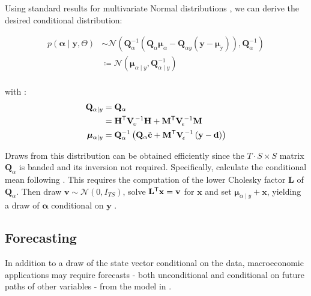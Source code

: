 \documentclass[notitlepage,a4paper,12pt]{article}
\newcommand{\transpose}[1]{{#1}^{\sf{T}}}
\begin{document}
Using standard results for multivariate Normal distributions \citep[e.g.][pp. 86-87]{bishop_prml_2006}, we can derive the desired conditional distribution:

\begin{align*}
    p
    \left(
        \boldsymbol{\alpha} \mid \mathbf{y}, \Theta
     \right) 
    &\sim
    \mathcal{N}
    \left(
    \mathbf{Q}^{-1}_{\alpha} \left( \mathbf{Q}_{\alpha}\boldsymbol{\mu}_{\alpha} - \mathbf{Q}_{\alpha y} \left(\mathbf{y} - \boldsymbol{\mu}_{\text{y}}\right)\right), \mathbf{Q}_{\alpha}^{-1}
    \right) \\
    &\coloneqq \mathcal{N}
        \left(
            \boldsymbol{\mu}_{\alpha\mid y}, \mathbf{Q}_{\alpha\mid y}^{-1}
        \right) \\
\end{align*}

with \citep[see also][eqn. 6-8]{chanjeliazkov_2009}:
\begin{align*}
    \mathbf{Q}_{\alpha\mid y} &= \mathbf{Q}_{\alpha} \\
    &= 
    \transpose{\mathbf{H}} \mathbf{V}^{\,-1}_{\!\upsilon} \mathbf{H} + {\transpose{\mathbf{M}} \mathbf{V}^{\,-1}_{\!\epsilon}\mathbf{M}}\\
    \boldsymbol\mu_{\alpha\mid y} &= \mathbf{Q}_{\alpha}^{-1} \left(\mathbf{Q}_{\alpha} \tilde{\mathbf{c}}+ \transpose{\mathbf{M}} \mathbf{V}_{\!\epsilon}^{\,-1} \left(\mathbf{y} - \mathbf{d}\right) \right)
\end{align*}

Draws from this distribution can be obtained efficiently since the $T\cdot S \times S$ matrix $\mathbf{Q}_{\alpha}$ is banded and its inversion not required. Specifically, calculate the conditional mean following \citet[][Algorithm 2.1]{rueheld_2005}. This requires the computation of the lower Cholesky factor $\mathbf{L}$ of $\mathbf{Q}_{\alpha}$. Then draw $\mathbf{v} \sim \mathcal{N}(0,I_{TS})$, solve $\transpose{\mathbf{L}} \mathbf{x} = \mathbf{v}$ for $\mathbf{x}$ and set $\boldsymbol{\mu}_{\alpha\mid y} +\mathbf{x}$, yielding a draw of $\boldsymbol{\alpha}$ conditional on $\mathbf{y}$ \citep[][Algorithm 2.4]{rueheld_2005}. \\

\subsection{Forecasting}

In addition to a draw of the state vector conditional on the data, macroeconomic applications may require forecasts - both unconditional and conditional on future paths of other variables - from the model in . 
\end{document}
